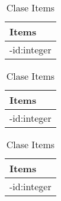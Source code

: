 \documentclass{article}
\begin{document}
\begin{table}
	\centering
	\begin{tabular}{|l|}
	\hline
		Items\\
	\hline
		-id:integer\\
	  \hline
	\end{tabular}
	\caption{Clase Items}
	\label{tab:Items}
\end{table}
\begin{table}
	\centering
	\begin{tabular}{|l|}
	\hline
		Items\\
	\hline
		-id:integer\\
	  \hline
	\end{tabular}
	\caption{Clase Items}
	\label{tab:Items}
\end{table}
\begin{table}
	\centering
	\begin{tabular}{|l|}
	\hline
		Items\\
	\hline
		-id:integer\\
	  \hline
	\end{tabular}
	\caption{Clase Items}
	\label{tab:Items}
\end{table}
\end{document}
